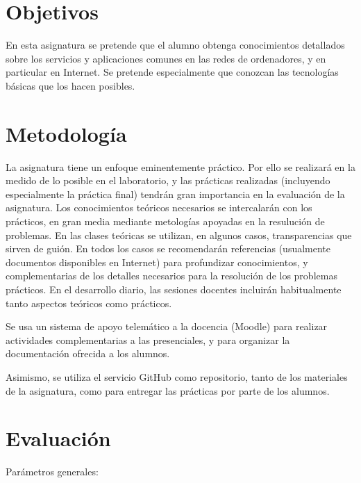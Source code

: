 \documentclass[a4paper,12pt]{article}
\begin{document}
\section{Objetivos}

En esta asignatura se pretende que el alumno obtenga conocimientos detallados sobre los servicios y aplicaciones comunes en las redes de ordenadores, y en particular en Internet. Se pretende especialmente que conozcan las tecnologías básicas que los hacen posibles.

\section{Metodología}

La asignatura tiene un enfoque eminentemente práctico. Por ello se realizará en la medido de lo posible en el laboratorio, y las prácticas realizadas (incluyendo especialmente la práctica final) tendrán gran importancia en la evaluación de la asignatura. Los conocimientos teóricos necesarios se intercalarán con los prácticos, en gran media mediante metologías apoyadas en la resulución de problemas. En las clases teóricas se utilizan, en algunos casos, transparencias que sirven de guión. En todos los casos se recomendarán referencias (usualmente documentos disponibles en Internet) para profundizar conocimientos, y complementarias de los detalles necesarios para la resolución de los problemas prácticos. En el desarrollo diario, las sesiones docentes incluirán habitualmente tanto aspectos teóricos como prácticos.

Se usa un sistema de apoyo telemático a la docencia (Moodle) para realizar actividades complementarias a las presenciales, y para organizar la documentación ofrecida a los alumnos.

Asimismo, se utiliza el servicio GitHub como repositorio, tanto de los materiales de la
asignatura, como para entregar las prácticas por parte de los alumnos.

\newpage

\section{Evaluación}

Parámetros generales:
\end{document}
